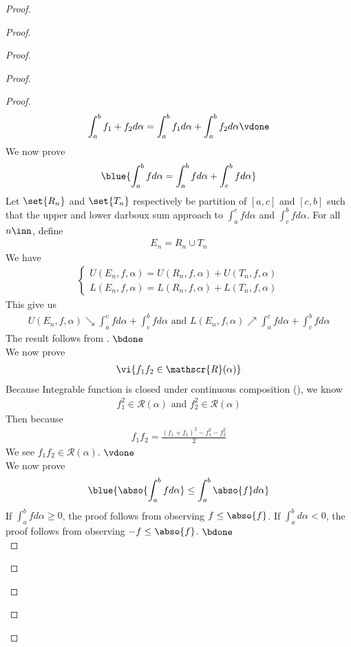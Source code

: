 \documentclass{report}
\begin{document}
\begin{proof}
\begin{proof}
\begin{proof}
\begin{proof}
\begin{proof}
\begin{align*}
\int_a^b f_1+f_2 d\alpha =\int_a^b f_1 d\alpha +\int_a^b f_2 d\alpha \vdone
\end{align*}
We now prove 
\begin{align*}
\blue{\int_a^b f d\alpha =\int_a^b fd\alpha +\int_c^b fd\alpha }
\end{align*}
Let $\set{R_n}$ and $\set{T_n}$ respectively be partition of $[a,c]$ and $[c,b]$ such that the upper and lower darboux sum approach to $\int_a^c fd\alpha $ and $\int_c^b fd\alpha $. For all $n\inn$, define 
\begin{align*}
E_n=R_n \cup  T_n
\end{align*}
We have 
\begin{align*}
\begin{cases}
U(E_n,f,\alpha )=U(R_n,f,\alpha )+U(T_n,f,\alpha ) \\
L(E_n,f,\alpha )=L(R_n,f,\alpha )+L(T_n,f,\alpha )
\end{cases}
\end{align*}
This give us 
\begin{align*}
U(E_n,f,\alpha )\searrow \int_a^c fd\alpha +\int_c^b fd\alpha \text{ and }L (E_n,f,\alpha )\nearrow \int_a^c fd\alpha +\int_c^b fd\alpha 
\end{align*}
The result follows from . $\bdone$\\

We now prove 
\begin{align*}
\vi{f_1f_2 \in \mathscr{R}(\alpha )}
\end{align*}
Because Integrable function is closed under continuous composition (), we know 
\begin{align*}
f_1^2 \in \mathscr{R}(\alpha )\text{ and }f_2^2 \in \mathscr{R}(\alpha )
\end{align*}
Then because 
\begin{align*}
f_1f_2=\frac{(f_1+f_1)^2 -f_1^2 -f_2^2}{2}
\end{align*}
We see $f_1f_2\in \mathscr{R}(\alpha )$. $\vdone$\\


We now prove 
\begin{align*}
\blue{\abso{\int_a^b fd\alpha }\leq \int_a^b \abso{f}d\alpha }
\end{align*}
If $\int_a^b fd\alpha \geq 0$, the proof follows from observing $f\leq \abso{f}$. If $\int_a^b d\alpha <0$, the proof follows from observing $-f\leq \abso{f}$. $\bdone$\\


\end{proof}
\end{proof}
\end{proof}
\end{proof}
\end{proof}
\end{document}

